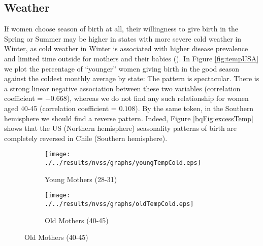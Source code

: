 \documentclass[a4paper, 11.5 pt]{article}
\theoremstyle{plain}
\begin{document}
\begin{doublespace}
\subsection{Weather}
If women choose season of birth at all, their willingness to give birth in the Spring or Summer may be higher in states with more severe cold weather in Winter, as cold weather in Winter is associated with higher disease prevalence and limited time outside for mothers and their babies (\citealp{CS2013}). In Figure \ref{fig:tempUSA} we plot the percentage of ``younger'' women giving birth in the good season against the coldest monthly average by state: The pattern is spectacular. There is a strong linear negative association between these two variables (correlation coefficient = $-0.668$), whereas we do not find any such relationship for women aged 40-45 (correlation coefficient = $0.108$). By the same token, in the Southern hemisphere we should find a reverse pattern. Indeed, Figure \ref{bqFig:excessTemp} shows that the US (Northern hemisphere) seasonality patterns of birth are completely reversed in Chile (Southern hemisphere).

\begin{figure}[htpb!]
\begin{center}
\caption{Prevalence of Good Season and Cold Temperatures by State and Age}
\label{fig:tempUSA}
\begin{subfigure}{.5\textwidth}
  \centering
  \texttt{[image: ./../results/nvss/graphs/youngTempCold.eps]}
  \caption{Young Mothers (28-31)}
  \label{fig:tempUSAYoung}
\end{subfigure}%
\begin{subfigure}{.5\textwidth}
  \centering
  \texttt{[image: ./../results/nvss/graphs/oldTempCold.eps]}
  \caption{Old Mothers (40-45)}
  \label{fig:tempUSAOld}
\end{subfigure}
\end{center}
\end{figure}




\end{doublespace}
\end{document}
